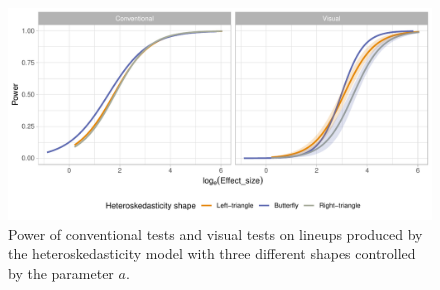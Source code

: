 \documentclass[]{interact}
\theoremstyle{plain}%
\theoremstyle{definition}
\theoremstyle{remark}
\begin{document}
\begin{figure}

{\centering \includegraphics[width=1\linewidth]{paper_comparison_files/figure-latex/heter-power-a-1} 

}

\caption{Power of conventional tests and visual tests on lineups produced by the heteroskedasticity model with three different shapes controlled by the parameter $a$.}\label{fig:heter-power-a}
\end{figure}

\newpage



\end{document}
